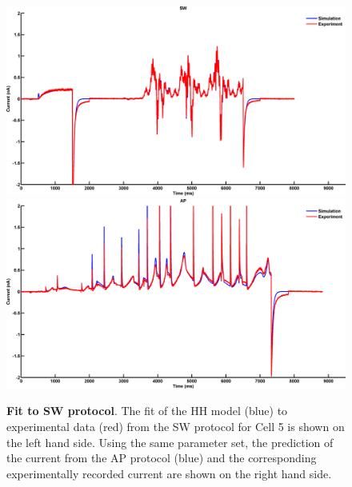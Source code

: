 \documentclass[11pt,a4paper,oneside]{article}
\begin{document}
\begin{figure}[ht]
\begin{center}
\includegraphics[scale=0.42]{Figures/Fig_hh_16713110_FP_sine_wave_CP_sine_wave.png}
\includegraphics[scale=0.42]{Figures/Fig_hh_16713110_FP_sine_wave_CP_ap.png}
\caption{\textbf{Fit to SW protocol}. The fit of the HH model (blue) to experimental data (red) from the SW protocol  for Cell 5 is shown on the left hand side. Using the same parameter set, the prediction of the current from the AP protocol (blue) and the corresponding experimentally recorded current are shown on the right hand side.} 
\label{Fig_SWfit}
\end{center}
\end{figure}
\end{document}

